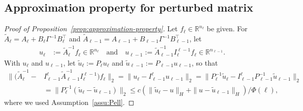 \documentclass[11pt,english]{article}
\theoremstyle{plain}
\theoremstyle{plain}
\theoremstyle{plain}
\theoremstyle{plain}
\numberwithin{equation}{section}
\begin{document}
\subsection{Approximation property for perturbed matrix}\label{sec:proof_perturbed_matrix}
\begin{proof}[Proof of Proposition~\ref{prop:approximation-property}]
	Let $f_{\ell}\in\mathbb{R}^{n_{\ell}}$ be given. For
	$\widetilde{A}_{\ell}=A_{\ell}+B_{\ell}\Gamma^{-1}B_{\ell}^{\top}$ and
	$\widetilde{A}_{\ell-1}=A_{\ell-1}+B_{\ell-1}\Gamma^{-1}B_{\ell-1}^{\top}$, let
	\begin{align*}
		u_{\ell} & :=\widetilde{A}_{\ell}^{-1}f_{\ell}\in\mathbb{R}^{n_{\ell}}
		\quad\text{and}\quad
		u_{\ell-1}:=\widetilde{A}_{\ell-1}^{-1}I_{\ell}^{\ell-1}f_{\ell}\in\mathbb{R}^{n_{\ell-1}}.
	\end{align*}
	With $u_{\ell}$ and $u_{\ell-1}$, let $\tilde{u}_{\ell}:=P_{\ell}u_{\ell}$
	and $\tilde{u}_{\ell-1}:=P_{\ell-1}u_{\ell-1}$, so that
	\begin{align}
		\|(\widetilde{A}_{\ell}^{-1}- & I_{\ell-1}^{\ell}\widetilde{A}_{\ell-1}^{-1}I_{\ell}^{\ell-1})f_{\ell}\|_{2}  =\|u_{\ell}-I_{\ell-1}^{\ell}u_{\ell-1}\|_{2} =\|P_{\ell}^{-1}\tilde{u}_{\ell}-I_{\ell-1}^{\ell}P_{\ell-1}^{-1}\tilde{u}_{\ell-1}\|_{2} \\
		                              & =\|P_{\ell}^{-1}(\tilde{u}_{\ell}-\tilde{u}_{\ell-1})\|_{2}
		\leq c(\|\tilde{u}_{\ell}-u\|_{H}+\|u-\tilde{u}_{\ell-1}\|_{H})/\Phi(\ell),\label{eq:diff-in-uell-uellminus1}
	\end{align}
	where we used Assumption~\ref{assu:Pell}.


\end{proof}
\end{document}
